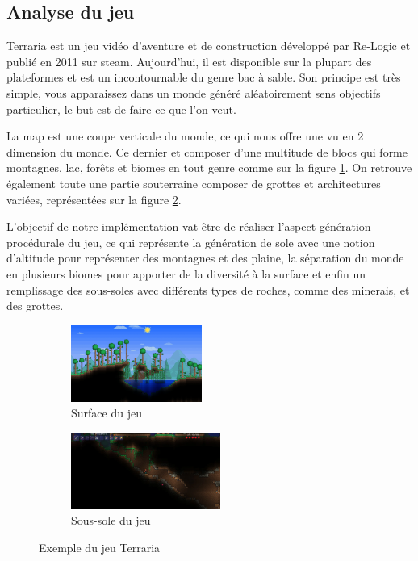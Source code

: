 \documentclass{article}
\begin{document}
\subsection{Analyse du jeu}

Terraria est un jeu vidéo d'aventure et de construction développé par Re-Logic et publié en 2011 sur steam. Aujourd'hui, il est disponible sur la plupart des plateformes et est un incontournable du genre bac à sable. Son principe est très simple, vous apparaissez dans un monde généré aléatoirement sens objectifs particulier, le but est de faire ce que l'on veut.\par
La map est une coupe verticale du monde, ce qui nous offre une vu en 2 dimension du monde. Ce dernier et composer d'une multitude de blocs qui forme montagnes, lac, forêts et biomes en tout genre comme sur la figure \ref{surface}. On retrouve également toute une partie souterraine composer de grottes et architectures variées, représentées sur la figure \ref{cavern}.\par
L'objectif de notre implémentation vat être de réaliser l'aspect génération procédurale du jeu, ce qui représente la génération de sole avec une notion d'altitude pour représenter des montagnes et des plaine, la séparation du monde en plusieurs biomes pour apporter de la diversité à la surface et enfin un remplissage des sous-soles avec différents types de roches, comme des minerais, et des grottes.

\begin{figure}[!h]
  \centering
  \begin{subfigure}[b]{0.4\textwidth}
    \centering
    \includegraphics[height=95px]{assets/terraria_forest_biome.jpg}
    \caption{Surface du jeu}
    \label{surface}
  \end{subfigure}
  \hspace{1cm}
  \begin{subfigure}[b]{0.4\textwidth}
    \centering
    \includegraphics[height=95px]{assets/terraria_cavern.png}
    \caption{Sous-sole du jeu}
    \label{cavern}
  \end{subfigure}
  \caption{Exemple du jeu Terraria}
  \label{ImageJeu}
\end{figure}
\end{document}
